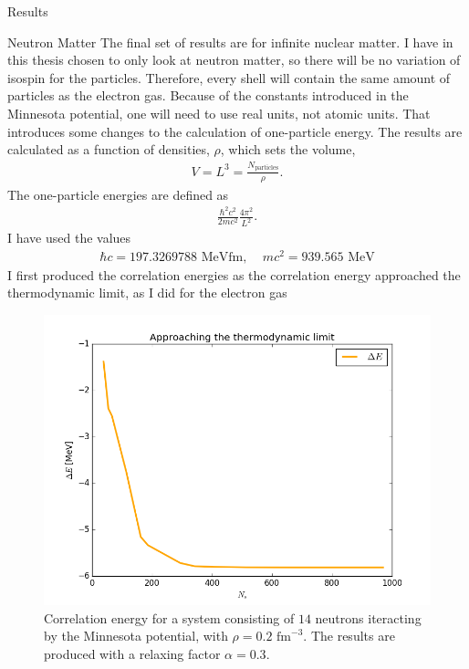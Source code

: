 \documentclass[twoside,english]{uiofysmaster}
\begin{document}
\begin{chapter}{Results}
	\begin{section}{Neutron Matter}
    The final set of results are for infinite nuclear matter. I have in this thesis chosen to only look at neutron matter, so there will be no variation of isospin for the particles. Therefore, every shell will contain the same amount of particles as the electron gas. Because of the constants introduced in the Minnesota potential, one will need to use real units, not atomic units. That introduces some changes to the calculation of one-particle energy. The results are calculated as a function of densities, $\rho$, which sets the volume, 
    \begin{align}
      V = L^3 = \frac{N_{\text{particles}}}{\rho}. 
    \end{align}
    The one-particle energies are defined as
    \begin{align}
      \frac{\hbar ^2 c^2}{2mc^2} \frac{4\pi^2}{L^2}. 
    \end{align}
    I have used the values 
    \begin{align}
      \hbar c = 197.3269788 \text{ MeVfm}, \:\:\:\:\: m c^2 = 939.565 \text{ MeV}
    \end{align}
    I first produced the correlation energies as the correlation energy approached the thermodynamic limit, as I did for the electron gas 
    \begin{figure}[]
      \includegraphics[width=\textwidth]{../NuclearMatter/Results/Figures/Thermodynamic_limit.png}
      \caption{Correlation energy for a system consisting of $14$ neutrons iteracting by the Minnesota potential, with $\rho=0.2\text{ fm}^{-3}$. The results are produced with a relaxing factor $\alpha=0.3$. }

\end{figure}
\end{section}
\end{chapter}
\end{document}
